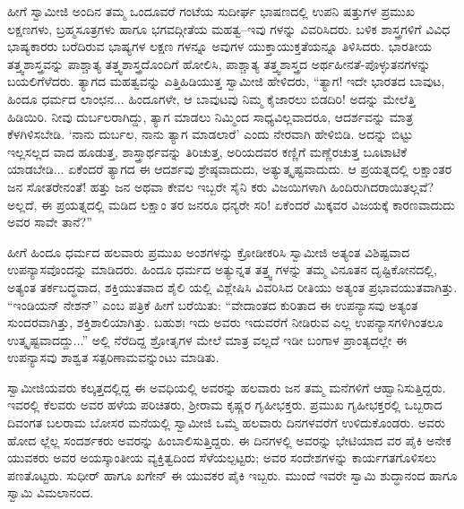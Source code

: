 ಹೀಗೆ ಸ್ವಾಮೀಜಿ ಅಂದಿನ ತಮ್ಮ ಒಂದೂವರೆ ಗಂಟೆಯ ಸುದೀರ್ಘ ಭಾಷಣದಲ್ಲಿ ಉಪನಿ ಷತ್ತುಗಳ ಪ್ರಮುಖ ಲಕ್ಷಣಗಳು, ಬ್ರಹ್ಮಸೂತ್ರಗಳು ಹಾಗೂ ಭಗವದ್ಗೀತೆಯ ಮಹತ್ವ–ಇವು ಗಳನ್ನು ವಿವರಿಸಿದರು. ಬಳಿಕ ಶಾಸ್ತ್ರಗಳಿಗೆ ವಿವಿಧ ಭಾಷ್ಯಕಾರರು ಬರೆದಿರುವ ಭಾಷ್ಯಗಳ ಲಕ್ಷಣ ಗಳನ್ನೂ ಅವುಗಳ ಯುಕ್ತಾಯುಕ್ತತೆಯನ್ನೂ ತಿಳಿಸಿದರು. ಭಾರತೀಯ ತತ್ತ್ವಶಾಸ್ತ್ರವನ್ನು ಪಾಶ್ಚಾತ್ಯ ತತ್ತ್ವಶಾಸ್ತ್ರದೊಂದಿಗೆ ಹೋಲಿಸಿ, ಪಾಶ್ಚಾತ್ಯ ತತ್ತ್ವಶಾಸ್ತ್ರದ ಅರ್ಥಹೀನತೆ-ಪೊಳ್ಳುತನಗಳನ್ನು ಬಯಲಿಗೆಳೆದರು. ತ್ಯಾಗದ ಮಹತ್ವವನ್ನು ಎತ್ತಿಹಿಡಿಯುತ್ತ ಸ್ವಾಮೀಜಿ ಹೇಳಿದರು, “ತ್ಯಾಗ! ಇದೇ ಭಾರತದ ಬಾವುಟ, ಹಿಂದೂ ಧರ್ಮದ ಲಾಂಛನ... ಹಿಂದೂಗಳೇ, ಆ ಬಾವುಟವು ನಿಮ್ಮ ಕೈಜಾರಲು ಬಿಡದಿರಿ! ಅದನ್ನು ಮೇಲೆತ್ತಿ ಹಿಡಿಯಿರಿ. ನೀವು ದುರ್ಬಲರಾಗಿದ್ದು, ತ್ಯಾಗ ಮಾಡಲು ನಿಮ್ಮಿಂದ ಸಾಧ್ಯವಿಲ್ಲವಾದರೂ, ಆದರ್ಶವನ್ನು ಮಾತ್ರ ಕೆಳಗಿಳಿಸಬೇಡಿ. ‘ನಾನು ದುರ್ಬಲ, ನಾನು ತ್ಯಾಗ ಮಾಡಲಾರೆ’ ಎಂದು ನೇರವಾಗಿ ಹೇಳಿಬಿಡಿ. ಅದನ್ನು ಬಿಟ್ಟು ಇಲ್ಲಸಲ್ಲದ ವಾದ ಹೂಡುತ್ತ, ಶಾಸ್ತ್ರಾರ್ಥವನ್ನು ತಿರಿಚುತ್ತ, ಅರಿಯದವರ ಕಣ್ಣಿಗೆ ಮಣ್ಣೆರಚುತ್ತ ಬೂಟಾಟಿಕೆ ಯಾಡಬೇಡಿ... ಏಕೆಂದರೆ ತ್ಯಾಗದ ಈ ಆದರ್ಶವು ಶ್ರೇಷ್ಠವಾದುದು, ಅತ್ಯುತ್ಕೃಷ್ಟವಾದುದು. ಆ ಪ್ರಯತ್ನದಲ್ಲಿ ಲಕ್ಷಾಂತರ ಜನ ಸೋತರೇನಂತೆ! ಹತ್ತು ಜನ ಅಥವಾ ಕೇವಲ ಇಬ್ಬರೇ ಸೈನಿ ಕರು ವಿಜಯಿಗಳಾಗಿ ಹಿಂದಿರುಗಿದರಾಯಿತಲ್ಲವೆ? ಅಲ್ಲದೆ, ಈ ಪ್ರಯತ್ನದಲ್ಲಿ ಮಡಿದ ಲಕ್ಷಾಂ ತರ ಜನರೂ ಧನ್ಯರೇ ಸರಿ! ಏಕೆಂದರೆ ಮಿಕ್ಕವರ ವಿಜಯಕ್ಕೆ ಕಾರಣವಾದುದು ಅವರ ಸಾವೇ ತಾನೆ?”

ಹೀಗೆ ಹಿಂದೂ ಧರ್ಮದ ಹಲವಾರು ಪ್ರಮುಖ ಅಂಶಗಳನ್ನು ಕ್ರೋಡೀಕರಿಸಿ ಸ್ವಾಮೀಜಿ ಅತ್ಯಂತ ವಿಶಿಷ್ಟವಾದ ಉಪನ್ಯಾಸವೊಂದನ್ನು ಮಾಡಿದರು. ಹಿಂದೂ ಧರ್ಮದ ಅತ್ಯುನ್ನತ ತತ್ತ್ವ ಗಳನ್ನು ತಮ್ಮ ವಿನೂತನ ದೃಷ್ಟಿಕೋನದಲ್ಲಿ, ಅತ್ಯಂತ ತರ್ಕಬದ್ಧವಾದ, ಶಕ್ತಿಯುತವಾದ ಶೈಲಿ ಯಲ್ಲಿ ವಿಶ್ಲೇಷಿಸಿ ವಿವರಿಸಿದ ರೀತಿಯು ಅತ್ಯಂತ ಪ್ರಭಾವಯುತವಾಗಿತ್ತು. “ಇಂಡಿಯನ್ ನೇಶನ್​” ಎಂಬ ಪತ್ರಿಕೆ ಹೀಗೆ ಬರೆಯಿತು: “ವೇದಾಂತದ ಕುರಿತಾದ ಈ ಉಪನ್ಯಾಸವು ಅತ್ಯಂತ ಸುಂದರವಾಗಿತ್ತು, ಶಕ್ತಿಶಾಲಿಯಾಗಿತ್ತು. ಬಹುಶಃ ಇದು ಅವರು ಇದುವರೆಗೆ ನೀಡಿರುವ ಎಲ್ಲ ಉಪನ್ಯಾಸಗಳಿಗಿಂತಲೂ ಉತ್ಕೃಷ್ಟವಾದದ್ದು...” ಅಲ್ಲಿ ನೆರೆದಿದ್ದ ಶ್ರೋತೃಗಳ ಮೇಲೆ ಮಾತ್ರ ವಲ್ಲದೆ ಇಡೀ ಬಂಗಾಳ ಪ್ರಾಂತ್ಯದಲ್ಲೇ ಈ ಉಪನ್ಯಾಸವು ಶಾಶ್ವತ ಸತ್ಪರಿಣಾಮವನ್ನುಂಟು ಮಾಡಿತು.

ಸ್ವಾಮೀಜಿಯವರು ಕಲ್ಕತ್ತದಲ್ಲಿದ್ದ ಈ ಅವಧಿಯಲ್ಲಿ ಅವರನ್ನು ಹಲವಾರು ಜನ ತಮ್ಮ ಮನೆಗಳಿಗೆ ಆಹ್ವಾನಿಸುತ್ತಿದ್ದರು. ಇವರಲ್ಲಿ ಕೆಲವರು ಅವರ ಹಳೆಯ ಪರಿಚಿತರು, ಶ್ರೀರಾಮ ಕೃಷ್ಣರ ಗೃಹೀಭಕ್ತರು. ಪ್ರಮುಖ ಗೃಹೀಭಕ್ತರಲ್ಲಿ ಒಬ್ಬರಾದ ದಿವಂಗತ ಬಲರಾಮ ಬೋಸರ ಮನೆಯಲ್ಲಿ ಸ್ವಾಮೀಜಿ ಒಮ್ಮೆ ಹಲವಾರು ದಿನಗಳವರೆಗೆ ಉಳಿದುಕೊಂಡರು. ಅವರು ಹೋದ ಲ್ಲೆಲ್ಲ ಸಂದರ್ಶಕರು ಅವರನ್ನು ಹಿಂಬಾಲಿಸುತ್ತಿದ್ದರು. ಈ ದಿನಗಳಲ್ಲಿ ಅವರನ್ನು ಭೇಟಿಯಾದ ವರ ಪೈಕಿ ಅನೇಕ ಯುವಕರು ಅವರ ಅಯಸ್ಕಾಂತೀಯ ವ್ಯಕ್ತಿತ್ವದಿಂದ ಸೆಳೆಯಲ್ಪಟ್ಟರು; ಅವರ ಸಂದೇಶಗಳನ್ನು ಕಾರ್ಯಗತಗೊಳಿಸಲು ಪಣತೊಟ್ಟರು. ಸುಧೀರ್ ಹಾಗೂ ಖಗೇನ್ ಈ ಯುವಕರ ಪೈಕಿ ಇಬ್ಬರು. ಮುಂದೆ ಇವರೇ ಸ್ವಾಮಿ ಶುದ್ಧಾನಂದ ಹಾಗೂ ಸ್ವಾಮಿ ವಿಮಲಾನಂದ.

